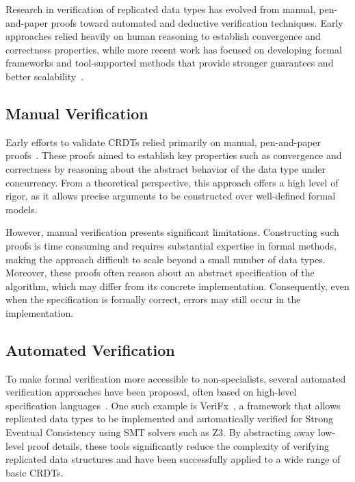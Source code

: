 Research in verification of replicated data types has evolved from manual, pen-and-paper proofs toward automated and deductive verification techniques. Early approaches relied heavily on human reasoning to establish convergence and correctness properties, while more recent work has focused on developing formal frameworks and tool-supported methods that provide stronger guarantees and better scalability~\cite{porre2023masses}.

\subsection{Manual Verification}
\label{sub:manual}

Early efforts to validate CRDTs relied primarily on manual, pen-and-paper proofs~\cite{shapiro2011comprehensive}. These proofs aimed to establish key properties such as convergence and correctness by reasoning about the abstract behavior of the data type under concurrency. From a theoretical perspective, this approach offers a high level of rigor, as it allows precise arguments to be constructed over well-defined formal models.

However, manual verification presents significant limitations. Constructing such proofs is time consuming and requires substantial expertise in formal methods, making the approach difficult to scale beyond a small number of data types. Moreover, these proofs often reason about an abstract specification of the algorithm, which may differ from its concrete implementation. Consequently, even when the specification is formally correct, errors may still occur in the implementation.

\subsection{Automated Verification}
\label{sub:automated}

To make formal verification more accessible to non-specialists, several automated verification approaches have been proposed, often based on high-level specification languages~\cite{kaki2019mergeablerdts}. One such example is VeriFx~\cite{porre2023masses}, a framework that allows replicated data types to be implemented and automatically verified for Strong Eventual Consistency using SMT solvers such as Z3. By abstracting away low-level proof details, these tools significantly reduce the complexity of verifying replicated data structures and have been successfully applied to a wide range of basic CRDTs.

